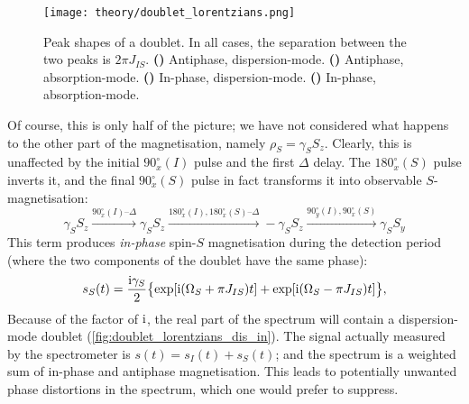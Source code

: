 \begin{figure}[htbp]
    \centering
    \texttt{[image: theory/doublet\_lorentzians.png]}%
    {\label{fig:doublet_lorentzians_dis_anti}}%
    {\label{fig:doublet_lorentzians_abs_anti}}%
    {\label{fig:doublet_lorentzians_dis_in}}%
    {\label{fig:doublet_lorentzians_abs_in}}%
    \caption[Absorption- and dispersion-mode in-phase and antiphase doublets]{
        Peak shapes of a doublet.
        In all cases, the separation between the two peaks is $2\pi J_{IS}$.
        \textbf{()} Antiphase, dispersion-mode.
        \textbf{()} Antiphase, absorption-mode.
        \textbf{()} In-phase, dispersion-mode.
        \textbf{()} In-phase, absorption-mode.
    }
    \label{fig:doublet_lorentzians}
\end{figure}

Of course, this is only half of the picture; we have not considered what happens to the other part of the magnetisation, namely $\rho_S = \gamma_S S_z$.
Clearly, this is unaffected by the initial $90^\circ_x(I)$ pulse and the first $\Delta$ delay.
The $180^\circ_x(S)$ pulse inverts it, and the final $90^\circ_x(S)$ pulse in fact transforms it into observable $S$-magnetisation:
\begin{equation}
    \label{eq:inept_prodop_s}
    \gamma_S S_z \xrightarrow{90^\circ_x(I)\text{--}\Delta} \gamma_S S_z
    \xrightarrow{180^\circ_x(I),180^\circ_x(S)\text{--}\Delta} -\gamma_S S_z
    \xrightarrow{90^\circ_y(I),90^\circ_x(S)} \gamma_S S_y
\end{equation}
This term produces \textit{in-phase} spin-$S$ magnetisation during the detection period (where the two components of the doublet have the same phase):
\begin{equation}
    \label{eq:inept_fid_S}
    s_S(t) = \frac{\mathrm{i}\gamma_S}{2}\bigl\{\exp[\mathrm{i}(\Omega_S + \pi J_{IS})t] + \exp[\mathrm{i}(\Omega_S - \pi J_{IS})t]\bigr\},
\end{equation}
Because of the factor of $\mathrm{i}$, the real part of the spectrum will contain a dispersion-mode doublet (\cref{fig:doublet_lorentzians_dis_in}).
The signal actually measured by the spectrometer is $s(t) = s_I(t) + s_S(t)$; and the spectrum is a weighted sum of in-phase and antiphase magnetisation.
This leads to potentially unwanted phase distortions in the spectrum, which one would prefer to suppress.

